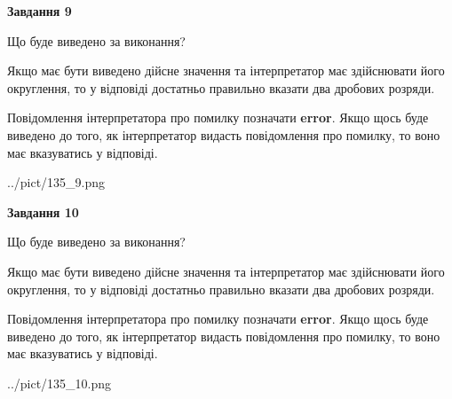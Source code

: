 \documentclass[12pt, ukrainian]{article}
\begin{document}
{\begin {Large}
{\begin {center}\textbf{Завдання 9}\end {center}}\par
Що буде виведено за виконання? \par

Якщо має бути виведено дійсне значення та інтерпретатор має здійснювати його округлення, 
то у відповіді достатньо правильно вказати два дробових розряди.

Повідомлення інтерпретатора про помилку позначати \textbf{error}.
Якщо щось буде виведено до того, як інтерпретатор видасть повідомлення про помилку, 
то воно має вказуватись у відповіді. \par

\begin{center}
	{../pict/135_9.png}
\end{center}
\newpage

{\begin {center}\textbf{Завдання 10}\end {center}}\par
Що буде виведено за виконання? \par

Якщо має бути виведено дійсне значення та інтерпретатор має здійснювати його округлення, 
то у відповіді достатньо правильно вказати два дробових розряди.

Повідомлення інтерпретатора про помилку позначати \textbf{error}.
Якщо щось буде виведено до того, як інтерпретатор видасть повідомлення про помилку, 
то воно має вказуватись у відповіді. \par

\begin{center}
	{../pict/135_10.png}
\end{center}
\newpage

\end {Large}}
\end{document}
